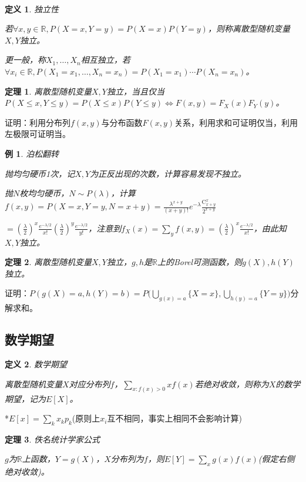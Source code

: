 \documentclass[a4paper,UTF8,fontset=windows]{ctexart}
\newtheorem{thm}{定理}[section]
\newtheorem{exmp}{例}[section]
\newtheorem{defi}{定义}[section]
\begin{document}
~

\begin{defi} 独立性

若$\forall x,y\in\mathbb{R},P(X=x,Y=y)=P(X=x)P(Y=y)$，则称离散型随机变量$X,Y$独立。

更一般，称$X_1,\dots,X_n$相互独立，若$\forall x_i\in\mathbb{R},P(X_1=x_1,\dots,X_n=x_n)=P(X_1=x_1)\cdots P(X_n=x_n)$。
\end{defi}

\begin{thm}
离散型随机变量$X,Y$独立，当且仅当$P(X\le x,Y\le y)=P(X\le x)P(Y\le y)\Leftrightarrow F(x,y)=F_X(x)F_Y(y)$。
\end{thm}

证明：利用分布列$f(x,y)$与分布函数$F(x,y)$关系，利用求和可证明仅当，利用左极限可证明当。

\begin{exmp} 泊松翻转

抛均匀硬币1次，记$X,Y$为正反出现的次数，计算容易发现不独立。

抛$N$枚均匀硬币，$N\sim P(\lambda)$，计算$f(x,y)=P(X=x,Y=y,N=x+y)=\frac{\lambda^{x+y}}{(x+y)!}e^{-\lambda}\frac{\mathrm{C}_{x+y}^x}{2^{x+y}}$

$=\left(\frac{\lambda}{2}\right)^x\frac{e^{-\lambda/2}}{x!}\left(\frac{\lambda}{2}\right)^y\frac{e^{-\lambda/2}}{y!}$，注意到$f_X(x)=\sum_yf(x,y)=\left(\frac{\lambda}{2}\right)^x\frac{e^{-\lambda/2}}{x!}$，由此知$X,Y$独立。
\end{exmp}

\begin{thm} 
离散型随机变量$X,Y$独立，$g,h$是$\mathbb{R}$上的Borel可测函数，则$g(X),h(Y)$独立。
\end{thm}

证明：$P(g(X)=a,h(Y)=b)=P\bigg(\bigcup_{g(x)=a}\{X=x\},\bigcup_{h(y)=a}\{Y=y\}\bigg)$分解求和。

\subsection{数学期望}
\begin{defi} 数学期望

离散型随机变量$X$对应分布列$f$，$\sum_{x:f(x)>0}xf(x)$若\emph{绝对收敛}，则称为$X$的数学期望，记为$E[X]$。
\end{defi}

*$E[x]=\sum_kx_kp_k$(原则上$x_i$互不相同，事实上相同不会影响计算)

\begin{thm} 佚名统计学家公式
	
$g$为$\mathbb{R}$上函数，$Y=g(X)$，$X$分布列为$f$，则$E[Y]=\sum_xg(x)f(x)$(假定右侧绝对收敛)。
\end{thm}
\end{document}
